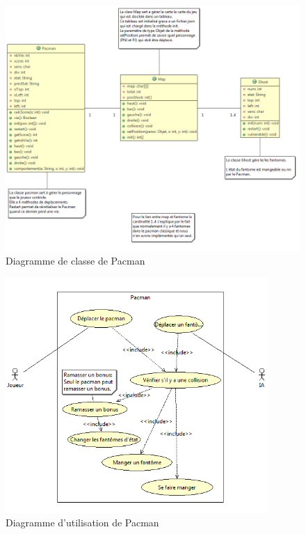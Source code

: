 \clearpage

\begin{figure}[h]
 \centering
 \includegraphics[width=\textwidth]{../umls/UML_images/Pacman/class} \hfill
 \caption{Diagramme de classe de Pacman}
\end{figure}

\begin{figure}[h]
 \centering
 \includegraphics[width=10cm]{../umls/UML_images/Pacman/utilisation}
 \caption{Diagramme d'utilisation de Pacman}
\end{figure}

